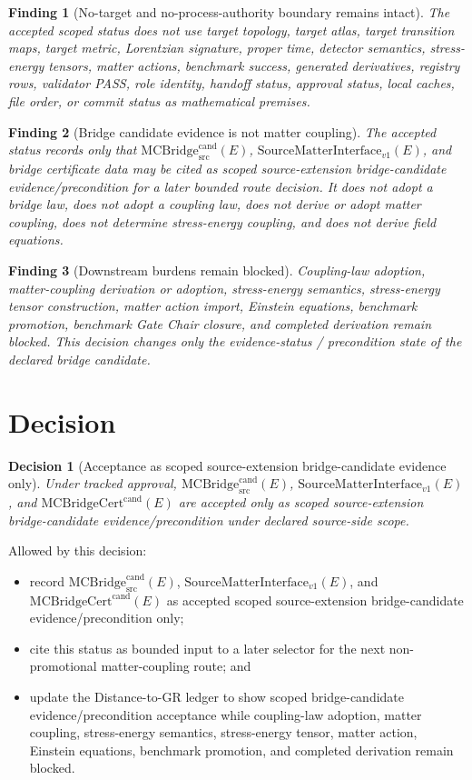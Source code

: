 \documentclass[11pt]{article}
\newcommand{\MCBridgeCand}{\mathrm{MCBridge}_{\mathrm{src}}^{\mathrm{cand}}}
\newcommand{\MCBridgeCertCand}{\mathrm{MCBridgeCert}^{\mathrm{cand}}}
\newcommand{\SMI}{\mathrm{SourceMatterInterface}_{v1}}
\newtheorem{decision}{Decision}
\newtheorem{finding}{Finding}
\begin{document}
\begin{finding}[No-target and no-process-authority boundary remains intact]
The accepted scoped status does not use target topology, target atlas, target
transition maps, target metric, Lorentzian signature, proper time, detector
semantics, stress-energy tensors, matter actions, benchmark success,
generated derivatives, registry rows, validator PASS, role identity, handoff
status, approval status, local caches, file order, or commit status as
mathematical premises.
\end{finding}

\begin{finding}[Bridge candidate evidence is not matter coupling]
The accepted status records only that \(\MCBridgeCand(E)\), \(\SMI(E)\), and
bridge certificate data may be cited as scoped source-extension
bridge-candidate evidence/precondition for a later bounded route decision. It
does not adopt a bridge law, does not adopt a coupling law, does not derive or
adopt matter coupling, does not determine stress-energy coupling, and does not
derive field equations.
\end{finding}

\begin{finding}[Downstream burdens remain blocked]
Coupling-law adoption, matter-coupling derivation or adoption, stress-energy
semantics, stress-energy tensor construction, matter action import, Einstein
equations, benchmark promotion, benchmark Gate Chair closure, and completed
derivation remain blocked. This decision changes only the evidence-status /
precondition state of the declared bridge candidate.
\end{finding}

\section{Decision}

\begin{decision}[Acceptance as scoped source-extension bridge-candidate evidence only]
Under tracked approval, \(\MCBridgeCand(E)\), \(\SMI(E)\), and
\(\MCBridgeCertCand(E)\) are accepted only as scoped source-extension
bridge-candidate evidence/precondition under declared source-side scope.
\end{decision}

Allowed by this decision:
\begin{itemize}[leftmargin=*]
  \item record \(\MCBridgeCand(E)\), \(\SMI(E)\), and
  \(\MCBridgeCertCand(E)\) as accepted scoped source-extension
  bridge-candidate evidence/precondition only;
  \item cite this status as bounded input to a later selector for the next
  non-promotional matter-coupling route; and
  \item update the Distance-to-GR ledger to show scoped bridge-candidate
  evidence/precondition acceptance while coupling-law adoption, matter
  coupling, stress-energy semantics, stress-energy tensor, matter action,
  Einstein equations, benchmark promotion, and completed derivation remain
  blocked.
\end{itemize}
\end{document}
